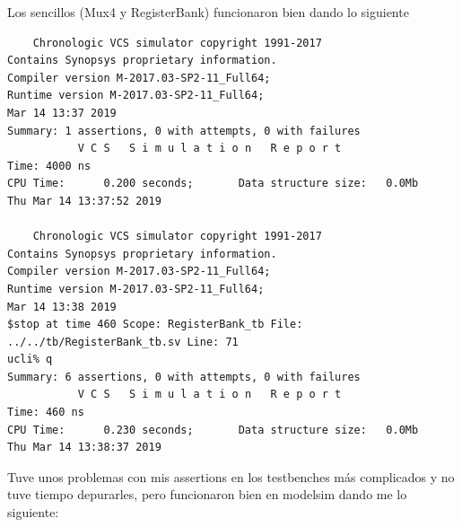 \documentclass[a4paper]{article}
\begin{document}
Los sencillos (Mux4 y RegisterBank) funcionaron bien dando lo siguiente

\begin{verbatim}
    Chronologic VCS simulator copyright 1991-2017
Contains Synopsys proprietary information.
Compiler version M-2017.03-SP2-11_Full64;
Runtime version M-2017.03-SP2-11_Full64;
Mar 14 13:37 2019
Summary: 1 assertions, 0 with attempts, 0 with failures
           V C S   S i m u l a t i o n   R e p o r t 
Time: 4000 ns
CPU Time:      0.200 seconds;       Data structure size:   0.0Mb
Thu Mar 14 13:37:52 2019

    Chronologic VCS simulator copyright 1991-2017
Contains Synopsys proprietary information.
Compiler version M-2017.03-SP2-11_Full64;
Runtime version M-2017.03-SP2-11_Full64;
Mar 14 13:38 2019
$stop at time 460 Scope: RegisterBank_tb File: ../../tb/RegisterBank_tb.sv Line: 71
ucli% q
Summary: 6 assertions, 0 with attempts, 0 with failures
           V C S   S i m u l a t i o n   R e p o r t 
Time: 460 ns
CPU Time:      0.230 seconds;       Data structure size:   0.0Mb
Thu Mar 14 13:38:37 2019
\end{verbatim}

Tuve unos problemas con mis assertions en los testbenches más complicados y no tuve tiempo depurarles, pero funcionaron bien en modelsim dando me lo siguiente:
\end{document}
